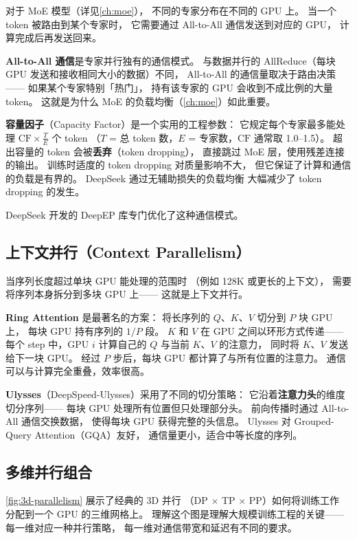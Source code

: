 对于 MoE 模型（详见\cref{ch:moe}），
不同的专家分布在不同的 GPU 上。
当一个 token 被路由到某个专家时，
它需要通过 All-to-All 通信发送到对应的 GPU，
计算完成后再发送回来。

\textbf{All-to-All 通信}是专家并行独有的通信模式。
与数据并行的 AllReduce（每块 GPU 发送和接收相同大小的数据）不同，
All-to-All 的通信量取决于路由决策——
如果某个专家特别「热门」，
持有该专家的 GPU 会收到不成比例的大量 token。
这就是为什么 MoE 的负载均衡（\cref{ch:moe}）如此重要。

\textbf{容量因子}（Capacity Factor）是一个实用的工程参数：
它规定每个专家最多能处理 $\mathrm{CF} \times \frac{T}{E}$ 个 token
（$T$ = 总 token 数，$E$ = 专家数，$\mathrm{CF}$ 通常取 1.0--1.5）。
超出容量的 token 会被\textbf{丢弃}（token dropping），
直接跳过 MoE 层，使用残差连接的输出。
训练时适度的 token dropping 对质量影响不大，
但它保证了计算和通信的负载是有界的。
DeepSeek 通过无辅助损失的负载均衡
大幅减少了 token dropping 的发生。

DeepSeek 开发的 DeepEP 库专门优化了这种通信模式。

\subsection{上下文并行（Context Parallelism）}

当序列长度超过单块 GPU 能处理的范围时
（例如 128K 或更长的上下文），
需要将序列本身拆分到多块 GPU 上——
这就是上下文并行。

\textbf{Ring Attention} 是最著名的方案：
将长序列的 $Q$、$K$、$V$ 切分到 $P$ 块 GPU 上，
每块 GPU 持有序列的 $1/P$ 段。
$K$ 和 $V$ 在 GPU 之间以环形方式传递——
每个 step 中，GPU $i$ 计算自己的 $Q$ 与当前 $K$、$V$ 的注意力，
同时将 $K$、$V$ 发送给下一块 GPU。
经过 $P$ 步后，每块 GPU 都计算了与所有位置的注意力。
通信可以与计算完全重叠，效率很高。

\textbf{Ulysses}（DeepSpeed-Ulysses）采用了不同的切分策略：
它沿着\textbf{注意力头}的维度切分序列——
每块 GPU 处理所有位置但只处理部分头。
前向传播时通过 All-to-All 通信交换数据，
使得每块 GPU 获得完整的头信息。
Ulysses 对 Grouped-Query Attention（GQA）友好，
通信量更小，适合中等长度的序列。

\subsection{多维并行组合}
\label{sec:5d-parallelism}

\cref{fig:3d-parallelism} 展示了经典的 3D 并行
（DP $\times$ TP $\times$ PP）如何将训练工作
分配到一个 GPU 的三维网格上。
理解这个图是理解大规模训练工程的关键——
每一维对应一种并行策略，
每一维对通信带宽和延迟有不同的要求。

